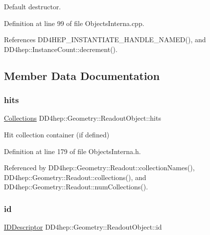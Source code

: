 Default destructor. 



Definition at line 99 of file Objects\+Interna.\+cpp.



References D\+D4\+H\+E\+P\+\_\+\+I\+N\+S\+T\+A\+N\+T\+I\+A\+T\+E\+\_\+\+H\+A\+N\+D\+L\+E\+\_\+\+N\+A\+M\+E\+D(), and D\+D4hep\+::\+Instance\+Count\+::decrement().



\subsection{Member Data Documentation}
\hypertarget{class_d_d4hep_1_1_geometry_1_1_readout_object_a07fe52ab89e2b0806f68da5eea1d8899}{}\label{class_d_d4hep_1_1_geometry_1_1_readout_object_a07fe52ab89e2b0806f68da5eea1d8899} 
\subsubsection{\texorpdfstring{hits}{hits}}
{\footnotesize\ttfamily \hyperlink{class_d_d4hep_1_1_geometry_1_1_readout_object_a1093be792a71654cf6116686b0ab7cb6}{Collections} D\+D4hep\+::\+Geometry\+::\+Readout\+Object\+::hits}



Hit collection container (if defined) 



Definition at line 179 of file Objects\+Interna.\+h.



Referenced by D\+D4hep\+::\+Geometry\+::\+Readout\+::collection\+Names(), D\+D4hep\+::\+Geometry\+::\+Readout\+::collections(), and D\+D4hep\+::\+Geometry\+::\+Readout\+::num\+Collections().

\hypertarget{class_d_d4hep_1_1_geometry_1_1_readout_object_a46cd564f02d0c5c82382fe75f6bae2eb}{}\label{class_d_d4hep_1_1_geometry_1_1_readout_object_a46cd564f02d0c5c82382fe75f6bae2eb} 
\subsubsection{\texorpdfstring{id}{id}}
{\footnotesize\ttfamily \hyperlink{class_d_d4hep_1_1_geometry_1_1_i_d_descriptor}{I\+D\+Descriptor} D\+D4hep\+::\+Geometry\+::\+Readout\+Object\+::id}



